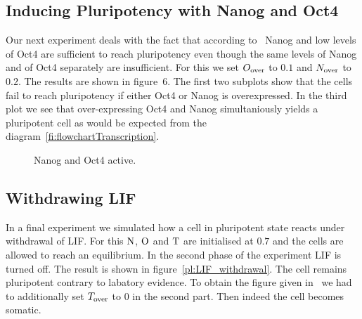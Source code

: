 \subsection{Inducing Pluripotency with Nanog and Oct4}

Our next experiment deals with the fact that according to~\cite{Olariu2016} Nanog and low levels
of Oct4 are sufficient to reach pluripotency even though the same levels of Nanog and of Oct4 separately
are insufficient. For this we set $O_\text{over}$ to $0.1$ and $N_\text{over}$ to $0.2$. The results are shown in
figure~6. The first two subplots show that the cells fail to reach pluripotency if either Oct4 or Nanog is overexpressed.
In the third plot we see that over-expressing Oct4 and Nanog simultaniously yields a pluripotent cell
as would be expected from the diagram~\ref{fi:flowchartTranscription}.


\begin{figure}
\centering
\begin{minipage}[t]{0.3\textwidth}
\centering
\graphicspath{{../Plots/}}

\end{minipage}
\hfill
\centering
\begin{minipage}[t]{0.3\textwidth}
\centering
\graphicspath{{../Plots/}}

\end{minipage}
\hspace*{0.2cm}
\begin{minipage}[t]{0.3\textwidth}
\centering
\graphicspath{{../Plots/}}

\end{minipage}
\caption{Nanog and Oct4 active.}
\label{pl:NO}
\end{figure}


\newpage

\subsection{Withdrawing LIF}

In a final experiment we simulated how a cell in pluripotent state reacts under withdrawal of LIF.
For this $\text{N}$, $\text{O}$ and $\text{T}$ are initialised at $0.7$ and the cells are allowed to reach an equilibrium.
In the second phase of the experiment LIF is turned off. The result is shown in figure~\ref{pl:LIF_withdrawal}.
The cell remains pluripotent contrary to labatory evidence.
To obtain the figure given in~\cite{Olariu2016} we had to additionally set $T_\text{over}$ to $0$
in the second part. Then indeed the cell becomes somatic.

